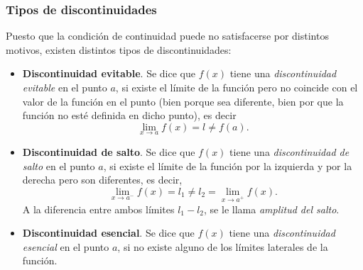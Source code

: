 \subsubsection*{Tipos de discontinuidades}
Puesto que la condición de continuidad puede no satisfacerse por
distintos motivos, existen distintos tipos de discontinuidades:


\begin{itemize}
\item \textbf{Discontinuidad evitable}. Se dice que $f(x)$ tiene una \emph{discontinuidad evitable} en el punto $a$, si existe el límite de la función  pero no coincide con el valor de la función en el punto (bien porque sea diferente, bien por que la función no esté definida en dicho punto), es decir
\[\lim_{x\rightarrow a}f(x)=l\neq f(a).\]

\item \textbf{Discontinuidad de salto}. Se dice que $f(x)$ tiene una \emph{discontinuidad de salto} en el punto $a$, si existe el límite de la función por la izquierda  y por la derecha pero son diferentes, es decir,
\[
\lim_{x\rightarrow a^-}f(x)=l_1\neq l_2=\lim_{x\rightarrow a^+}f(x).
\]
A la diferencia entre ambos límites $l_1-l_2$, se le llama
\emph{amplitud del salto}.

\item \textbf{Discontinuidad esencial}. Se dice que $f(x)$ tiene una \emph{discontinuidad esencial} en el punto $a$, si no existe alguno de los límites laterales de la función.
\end{itemize}

\newpage

